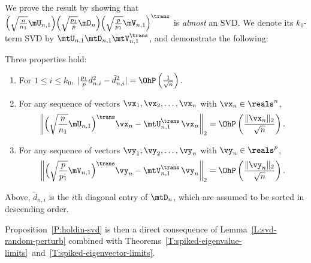 We prove the result by showing that
\(
    \Big(
        \sqrt{\frac{n}{n_1}} \mU_{n,1}
    \Big)
    \Big(
        \sqrt{\frac{p_1}{p}} \mD_n
    \Big)
    \Big(
        \sqrt{\frac{p}{p_1}}
        \mV_{n,1}
    \Big)^\trans
\)
is \emph{almost} an SVD.  We denote its $k_0$-term SVD by 
$\mtU_{n,1} \mtD_{n,1} \mtV_{n,1}^\trans$, and demonstrate the following:
\begin{lemma}\label{L:svd-random-perturb}
    Three properties hold:
    \begin{enumerate}[(1)]
        \item For $1 \leq i \leq k_0$, 
            \(
                |\frac{p_1}{p} d_{n,i}^2 - \tilde d_{n,i}^2| 
                    = 
                        \OhP\left(\frac{1}{\sqrt{n}}\right).
            \)
        \item For any sequence of vectors $\vx_1, \vx_2, \ldots, \vx_n$
            with $\vx_n \in \reals^n$,
            \[
                \left\|
                    \Big(
                        \sqrt{\frac{n}{n_1}} \mU_{n,1}
                    \Big)^\trans
                    \vx_n
                    -
                    \mtU_{n,1}^\trans \,
                    \vx_n
                \right\|_2
                =
                \OhP\left(\frac{\| \vx_n \|_2}{\sqrt{n}}\right).
            \]
        \item For any sequence of vectors $\vy_1, \vy_2, \ldots, \vy_n$
            with $\vy_n \in \reals^p$,
            \[
                \left\|
                    \Big(
                        \sqrt{\frac{p}{p_1}} \mV_{n,1}
                    \Big)^\trans
                    \vy_n
                    -
                    \mtV_{n,1}^\trans \,
                    \vy_n
                \right\|_2
                =
                \OhP\left(\frac{\| \vy_n \|_2}{\sqrt{n}}\right).
            \]
    \end{enumerate}
    Above, $\tilde d_{n,i}$ is the $i$th diagonal entry of $\mtD_{n}$,
    which are assumed to be sorted in descending order.
\end{lemma}
\noindent
Proposition~\ref{P:holdin-svd} is then a direct consequence of
Lemma~\ref{L:svd-random-perturb} combined with
Theorems~\ref{T:spiked-eigenvalue-limits}~and~\ref{T:spiked-eigenvector-limits}.

